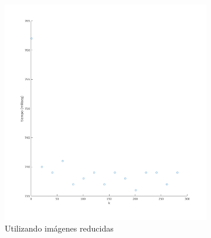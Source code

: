 %
\begin{figure}[H]
\begin{subfigure}[h]{0.62\linewidth}
\includegraphics[width=\linewidth]{img/k_knn_tiempo.png}
\caption{Utilizando imágenes reducidas}
\end{subfigure}
\hfill
\begin{subfigure}[h]{0.62\linewidth}

\end{subfigure}
\end{figure}
